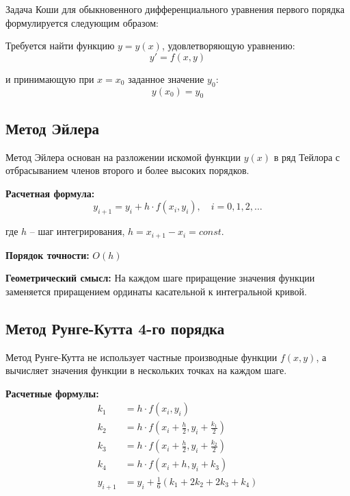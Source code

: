 \documentclass[12pt,a4paper]{article}
\begin{document}
Задача Коши для обыкновенного дифференциального уравнения первого порядка формулируется следующим образом:

Требуется найти функцию $y = y(x)$, удовлетворяющую уравнению:
\begin{equation}
    y' = f(x, y)
\end{equation}

и принимающую при $x = x_0$ заданное значение $y_0$:
\begin{equation}
    y(x_0) = y_0
\end{equation}

\subsection{Метод Эйлера}

Метод Эйлера основан на разложении искомой функции $y(x)$ в ряд Тейлора с отбрасыванием членов второго и более высоких порядков.

\textbf{Расчетная формула:}
\begin{equation}
    y_{i+1} = y_i + h \cdot f(x_i, y_i), \quad i = 0, 1, 2, \ldots
\end{equation}

где $h$ -- шаг интегрирования, $h = x_{i+1} - x_i = const$.

\textbf{Порядок точности:} $O(h)$

\textbf{Геометрический смысл:} На каждом шаге приращение значения функции заменяется приращением ординаты касательной к интегральной кривой.

\subsection{Метод Рунге-Кутта 4-го порядка}

Метод Рунге-Кутта не использует частные производные функции $f(x, y)$, а вычисляет значения функции в нескольких точках на каждом шаге.

\textbf{Расчетные формулы:}
\begin{align}
    k_1 &= h \cdot f(x_i, y_i) \\
    k_2 &= h \cdot f\left(x_i + \frac{h}{2}, y_i + \frac{k_1}{2}\right) \\
    k_3 &= h \cdot f\left(x_i + \frac{h}{2}, y_i + \frac{k_2}{2}\right) \\
    k_4 &= h \cdot f(x_i + h, y_i + k_3) \\
    y_{i+1} &= y_i + \frac{1}{6}(k_1 + 2k_2 + 2k_3 + k_4)
\end{align}
\end{document}
